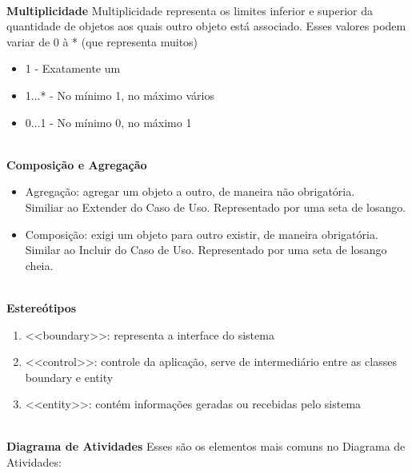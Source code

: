 \documentclass[12pt, a4paper]{article}
\begin{document}
\indent
\textbf{\\Multiplicidade}
Multiplicidade representa os limites inferior e superior da quantidade
de objetos aos quais outro objeto está associado. Esses valores podem variar de
0 à * (que representa muitos) 

\begin{itemize}

    \item 1 - Exatamente um
    \item 1...* - No mínimo 1, no máximo vários
    \item 0...1 - No mínimo 0, no máximo 1

\end{itemize}

\indent
\textbf{\\Composição e Agregação}

\begin{itemize}

    \item Agregação: agregar um objeto a outro, de maneira não obrigatória.\\
    Similiar ao Extender do Caso de Uso. Representado por uma seta de losango.
    \item Composição: exigi um objeto para outro existir, de maneira obrigatória.\\
    Similar ao Incluir do Caso de Uso. Representado por uma seta de losango cheia.

\end{itemize}

\newpage

\indent
\textbf{\\Estereótipos}

\begin{enumerate}[label*=\textbf{\arabic*}.]

    \item <<boundary>>: representa a interface do sistema 
    \item <<control>>: controle da aplicação, 
    serve de intermediário entre as classes boundary e entity
    \item <<entity>>: contém informações geradas ou recebidas pelo sistema

\end{enumerate}

\indent
\textbf{\\Diagrama de Atividades}
Esses são os elementos mais comuns no Diagrama de Atividades:
\end{document}
